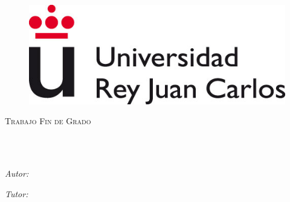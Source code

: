 \documentclass[
12pt, %
spanish, %
onehalfspacing, %
parskip, %
headsepline, %
chapterinoneline, %
]{MastersDoctoralThesis} %
\author{Sergio Merino Hernández} %
\begin{document}
\frontmatter %

\pagestyle{plain} %


\begin{titlepage}
\begin{center}

\vspace*{.01\textheight}
\begin{figure}
\begin{center}
\includegraphics[scale=0.5]{Figures/logo-urjc}
\end{center}
\end{figure}
\textsc{\Large Trabajo Fin de Grado}\\[0.5cm] %

\HRule \\[0.4cm] %
{\huge \bfseries \ttitle\par}\vspace{0.4cm} %
\HRule \\[1.5cm] %

\begin{minipage}[t]{0.4\textwidth}
\begin{flushleft} \large
\emph{Autor:}\\
\href{https://github.com/merinhunter}{\authorname} %
\end{flushleft}
\end{minipage}
\begin{minipage}[t]{0.4\textwidth}
\begin{flushright} \large
\emph{Tutor:} \\
\href{https://lsub.org/who/paurea/}{\supname} %
\end{flushright}
\end{minipage}\\[3cm]


\end{center}
\end{titlepage}
\end{document}
